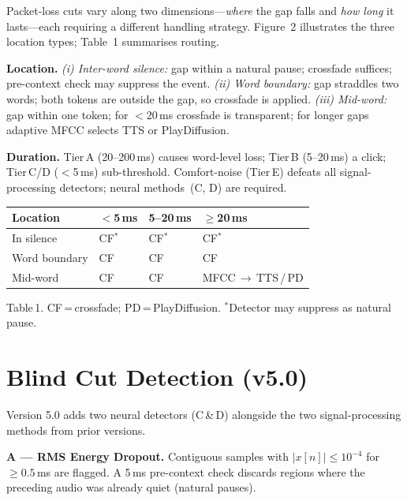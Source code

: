 \documentclass[9pt,twocolumn]{article}
\begin{document}
Packet-loss cuts vary along two dimensions---\emph{where} the gap falls
and \emph{how long} it lasts---each requiring a different handling
strategy.  Figure~2 illustrates the three location types;
Table~1 summarises routing.

\noindent\textbf{Location.}
\emph{(i) Inter-word silence:} gap within a natural pause; crossfade
suffices; pre-context check may suppress the event.
\emph{(ii) Word boundary:} gap straddles two words; both tokens are
outside the gap, so crossfade is applied.
\emph{(iii) Mid-word:} gap within one token; for ${<}20$\,ms crossfade
is transparent; for longer gaps adaptive MFCC selects TTS or PlayDiffusion.

\noindent\textbf{Duration.}
Tier\,A (20--200\,ms) causes word-level loss; Tier\,B (5--20\,ms) a
click; Tier\,C/D ($<$5\,ms) sub-threshold.  Comfort-noise (Tier\,E)
defeats all signal-processing detectors; neural methods~(C, D) are
required.

{\footnotesize\setlength{\tabcolsep}{3pt}
\begin{tabularx}{\columnwidth}{lXXX}
\toprule
\textbf{Location} & \textbf{$<$5\,ms} & \textbf{5--20\,ms}
  & \textbf{$\geq$20\,ms} \\
\midrule
In silence
  & \cellcolor{cDet!14}CF$^{*}$
  & \cellcolor{cDet!14}CF$^{*}$
  & \cellcolor{cDet!14}CF$^{*}$ \\
Word boundary
  & \cellcolor{cDet!14}CF
  & \cellcolor{cDet!14}CF
  & \cellcolor{cDet!14}CF \\
Mid-word
  & \cellcolor{cDet!14}CF
  & \cellcolor{cDet!14}CF
  & \cellcolor{cInp!20}MFCC\,${\to}$\,TTS\,/\,PD \\
\bottomrule
\end{tabularx}
}
\vspace{1pt}
{\tiny Table\,1.
CF\,=\,crossfade; PD\,=\,PlayDiffusion.
$^{*}$Detector may suppress as natural pause.}

\section{Blind Cut Detection (v5.0)}
\label{sec:detection}

Version 5.0 adds two neural detectors (C\,\&\,D) alongside the two
signal-processing methods from prior versions.

\noindent\textbf{A — RMS Energy Dropout.}
Contiguous samples with $|x[n]|\leq10^{-4}$ for $\geq0.5$\,ms are
flagged.  A 5\,ms pre-context check discards regions where the preceding
audio was already quiet (natural pauses).
\end{document}
